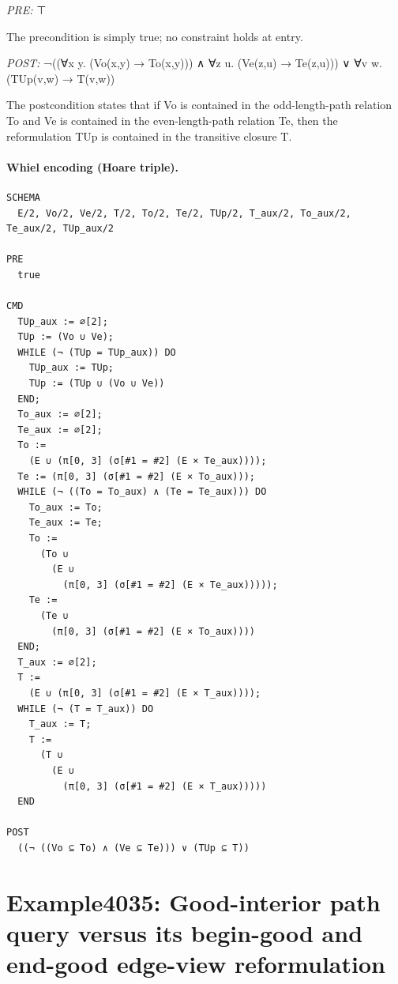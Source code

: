 \documentclass[10pt]{article}
\begin{document}
\textit{PRE:} ⊤\par The precondition is simply true; no constraint holds at entry.

\textit{POST:} ¬((∀x y. (Vo(x,y) → To(x,y))) ∧ ∀z u. (Ve(z,u) → Te(z,u))) ∨ ∀v w. (TUp(v,w) → T(v,w))\par The postcondition states that if Vo is contained in the odd-length-path relation To and Ve is contained in the even-length-path relation Te, then the reformulation TUp is contained in the transitive closure T.

\paragraph{Whiel encoding (Hoare triple).}

\begin{Verbatim}[fontsize=\tiny,breaklines=true,breakanywhere=true,frame=single,framesep=1.5mm]
SCHEMA
  E/2, Vo/2, Ve/2, T/2, To/2, Te/2, TUp/2, T_aux/2, To_aux/2, Te_aux/2, TUp_aux/2

PRE
  true 

CMD
  TUp_aux := ∅[2];
  TUp := (Vo ∪ Ve);
  WHILE (¬ (TUp = TUp_aux)) DO
    TUp_aux := TUp;
    TUp := (TUp ∪ (Vo ∪ Ve))
  END;
  To_aux := ∅[2];
  Te_aux := ∅[2];
  To :=
    (E ∪ (π[0, 3] (σ[#1 = #2] (E × Te_aux))));
  Te := (π[0, 3] (σ[#1 = #2] (E × To_aux)));
  WHILE (¬ ((To = To_aux) ∧ (Te = Te_aux))) DO
    To_aux := To;
    Te_aux := Te;
    To :=
      (To ∪
        (E ∪
          (π[0, 3] (σ[#1 = #2] (E × Te_aux)))));
    Te :=
      (Te ∪
        (π[0, 3] (σ[#1 = #2] (E × To_aux))))
  END;
  T_aux := ∅[2];
  T :=
    (E ∪ (π[0, 3] (σ[#1 = #2] (E × T_aux))));
  WHILE (¬ (T = T_aux)) DO
    T_aux := T;
    T :=
      (T ∪
        (E ∪
          (π[0, 3] (σ[#1 = #2] (E × T_aux)))))
  END

POST
  ((¬ ((Vo ⊆ To) ∧ (Ve ⊆ Te))) ∨ (TUp ⊆ T))
\end{Verbatim}

\Needspace{0.45\textheight}

\section{Example4035: Good-interior path query versus its begin-good and end-good edge-view reformulation}\label{case:Example4035}
\end{document}
